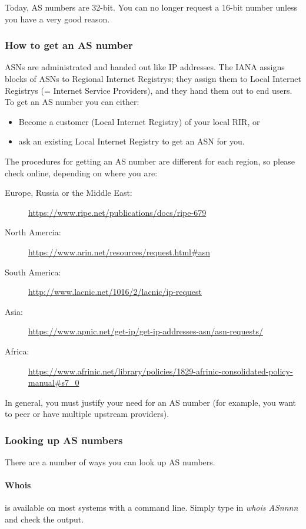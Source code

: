 Today, AS numbers are 32-bit. You can no longer request a 16-bit number unless
you have a very good reason.

\subsubsection{How to get an AS number}
ASNs are administrated and handed out like IP addresses.
The \gls{IANA} assigns blocks of ASNs to
 \glspl{Regional Internet Registry}; they assign them to \glspl{Local Internet Registry} (= Internet Service Providers), and they hand them out to end users.
To get an AS number you can either:
\begin{itemize}
  \item Become a customer (\gls{Local Internet Registry}) of your local \gls{RIR}, or
  \item ask an existing \gls{Local Internet Registry} to get an ASN for you.
\end{itemize}
The procedures for getting an AS number are different for each region, so please
check online, depending on where you are:
\begin{description}
  \item[Europe, Russia or the Middle East:]
    \url{https://www.ripe.net/publications/docs/ripe-679}
  \item[North Amercia:] \url{https://www.arin.net/resources/request.html#asn}
  \item[South America:] \url{http://www.lacnic.net/1016/2/lacnic/ip-request}
  \item[Asia:] \url{https://www.apnic.net/get-ip/get-ip-addresses-asn/asn-requests/}
  \item[Africa:] \url{https://www.afrinic.net/library/policies/1829-afrinic-consolidated-policy-manual#s7_0}
\end{description}
In general, you must justify your need for an AS number (for example, you want to peer or
have multiple upstream providers).

\subsubsection{Looking up AS numbers}
There are a number of ways you can look up AS numbers.

\paragraph{Whois}
is available on most systems with a command line. Simply type in
\emph{whois AS\emph{nnnn}} and check the output.


